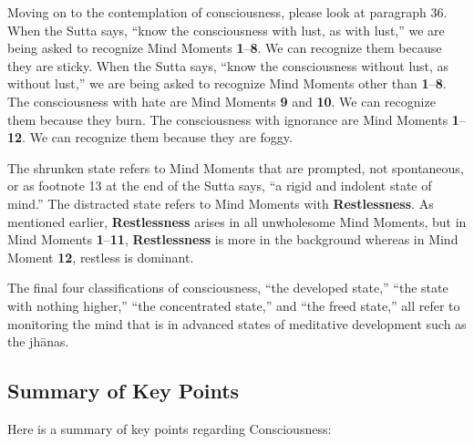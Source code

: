 Moving on to the contemplation of consciousness, please look at paragraph 36. When the Sutta says, “know the consciousness with lust, as with lust,” we are being asked to recognize Mind Moments \textbf{1}--\textbf{8}. We can recognize them because they are sticky. When the Sutta says, “know the consciousness without lust, as without lust,” we are being asked to recognize Mind Moments other than \textbf{1}--\textbf{8}. The consciousness with hate are Mind Moments \textbf{9} and \textbf{10}. We can recognize them because they burn. The consciousness with ignorance are Mind Moments \textbf{1}--\textbf{12}. We can recognize them because they are foggy.

The shrunken state refers to Mind Moments that are prompted, not spontaneous, or as footnote 13 at the end of the Sutta says, “a rigid and indolent state of mind.” The distracted state refers to Mind Moments with \textbf{Restlessness}. As mentioned earlier, \textbf{Restlessness} arises in all unwholesome Mind Moments, but in Mind Moments \textbf{1}--\textbf{11}, \textbf{Restlessness} is more in the background whereas in Mind Moment \textbf{12}, restless is dominant.

The final four classifications of consciousness, “the developed state,” “the state with nothing higher,” “the concentrated state,” and “the freed state,” all refer to monitoring the mind that is in advanced states of meditative development such as the jhānas.

\subsection*{Summary of Key Points}

Here is a summary of key points regarding Consciousness:

